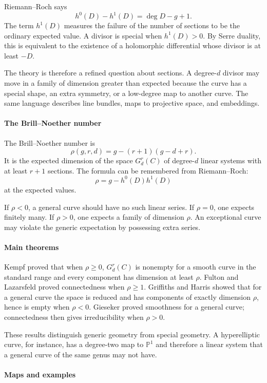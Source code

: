 Riemann--Roch says
\[
 h^0(D)-h^1(D)=\deg D-g+1.
\]
The term $h^1(D)$ measures the failure of the number of sections to be the ordinary expected value. A divisor is special when $h^1(D)>0$. By Serre duality, this is equivalent to the existence of a holomorphic differential whose divisor is at least $-D$.

The theory is therefore a refined question about sections. A degree-$d$ divisor may move in a family of dimension greater than expected because the curve has a special shape, an extra symmetry, or a low-degree map to another curve. The same language describes line bundles, maps to projective space, and embeddings.

\paragraph{The Brill--Noether number}

The Brill--Noether number is
\[
 \rho(g,r,d)=g-(r+1)(g-d+r).
\]
It is the expected dimension of the space $G^r_d(C)$ of degree-$d$ linear systems with at least $r+1$ sections. The formula can be remembered from Riemann--Roch:
\[
 \rho=g-h^0(D)h^1(D)
\]
at the expected values.

If $\rho<0$, a general curve should have no such linear series. If $\rho=0$, one expects finitely many. If $\rho>0$, one expects a family of dimension $\rho$. An exceptional curve may violate the generic expectation by possessing extra series.

\paragraph{Main theorems}

Kempf proved that when $\rho\geq0$, $G^r_d(C)$ is nonempty for a smooth curve in the standard range and every component has dimension at least $\rho$. Fulton and Lazarsfeld proved connectedness when $\rho\geq1$. Griffiths and Harris showed that for a general curve the space is reduced and has components of exactly dimension $\rho$, hence is empty when $\rho<0$. Gieseker proved smoothness for a general curve; connectedness then gives irreducibility when $\rho>0$.

These results distinguish generic geometry from special geometry. A hyperelliptic curve, for instance, has a degree-two map to $\mathbb P^1$ and therefore a linear system that a general curve of the same genus may not have.

\paragraph{Maps and examples}

